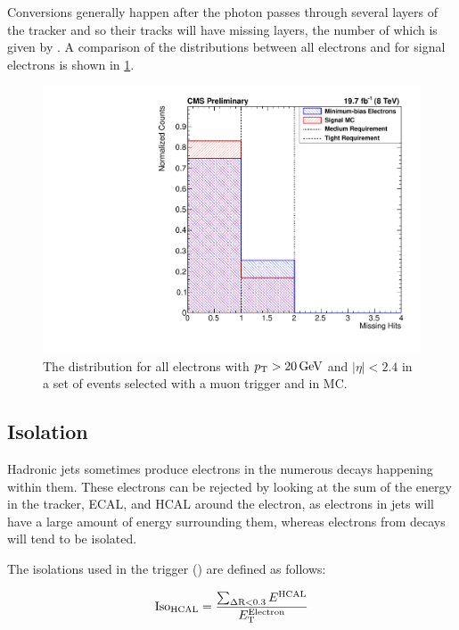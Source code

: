 Conversions generally happen after the photon passes through several layers of
the tracker and so their tracks will have missing layers, the number of which
is given by \nmiss. A comparison of the \nmiss distributions between all
electrons and for signal electrons is shown in \cref{fig:nmiss}.

\begin{figure}[!htbp]
    \centering
    \includegraphics[width=\StackedPlotWidth]{figures/e_reco_var_nmiss.pdf}
    \caption[
        Distributions of \nmiss in data and MC.
    ]{
        The \nmiss distribution for all electrons with $p_{\mathrm{T}} > 20 \,\text{Ge\hspace{-.08em}V}$ and
        $|\eta| < 2.4$ in a set of events selected with a muon trigger and in
        \MADGRAPH \Ztoee MC.
    }
    \label{fig:nmiss}
\end{figure}

\subsection{Isolation}
\label{ssec:iso}

Hadronic jets sometimes produce electrons in the numerous decays happening
within them. These electrons can be rejected by looking at the sum of the
energy in the tracker, ECAL, and HCAL around the electron, as electrons in jets
will have a large amount of energy surrounding them, whereas electrons from \Z
decays will tend to be isolated.

The isolations used in the trigger (\SingleElectronTrigger) are defined as
follows:

\begin{equation}
    \text{Iso}_{\text{HCAL}} = \frac{\sum_{\Delta \text{R}<0.3} E^{\text{HCAL}}}{E_{\mathrm{T}}^{\text{Electron}}}
\end{equation}

